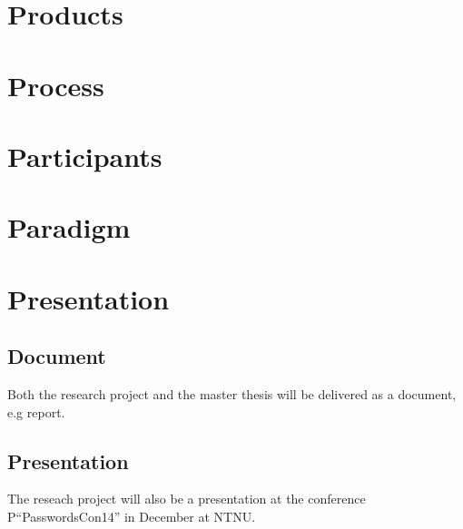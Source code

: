   \section*{Products}

  \section*{Process}

  \section*{Participants}

  \section*{Paradigm}

  \section*{Presentation}

    \subsection*{Document}

      Both the research project and the master thesis will be delivered as a document, e.g report. 

    \subsection*{Presentation}

      The reseach project will also be a presentation at the conference P``PasswordsCon14'' in December at NTNU.


  